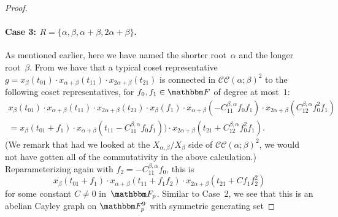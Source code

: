 \documentclass[10pt,a4paper]{article}
\theoremstyle{definition}
\newcommand{\F}{\mathbbm F}
\newcommand{\CC}[2]{\mathcal{C}\mathcal{C}(#1;#2)}
\begin{document}
\begin{proof}
    \paragraph{Case 3: $R = \{\alpha,\beta,\alpha+\beta, 2\alpha+\beta\}$.}  
    As mentioned earlier, here we have named the shorter root~$\alpha$ and the longer root~$\beta$.
    From  we have that a typical coset representative 
    $
        g = x_\beta(t_{01})\cdot x_{\alpha+\beta}(t_{11}) \cdot x_{2\alpha+\beta}(t_{21})
    $
    is connected in $\CC{\alpha}{\beta}^2$ to the following coset representatives, for $f_0, f_1 \in \F$ of degree at most~$1$:
    \begin{multline*}
        x_\beta(t_{01})\cdot x_{\alpha+\beta}(t_{11})\cdot x_{2\alpha+\beta}(t_{21}) \cdot x_{\beta}(f_1) \cdot x_{\alpha+\beta}(-C_{11}^{\beta,\alpha} f_0f_1) \cdot x_{2\alpha+\beta}(C_{12}^{\beta,\alpha} f_0^2f_1) \\
        = x_\beta(t_{01} + f_1)\cdot x_{\alpha+\beta}(t_{11}-C_{11}^{\beta,\alpha} f_0f_1))\cdot x_{2\alpha+\beta}(t_{21}+C_{12}^{\beta,\alpha} f_0^2f_1).
    \end{multline*}
    (We remark that had we looked at the $X_{\alpha,\beta}/X_\beta$ side of $\CC{\alpha}{\beta}^2$, we would not have gotten all of the commutativity in the above calculation.)
    Reparameterizing again with $f_2 = -C_{11}^{\beta,\alpha} f_0$, this is
    \[
        x_\beta(t_{01} + f_1)\cdot x_{\alpha+\beta}(t_{11}+f_1f_2) \cdot x_{2\alpha+\beta}(t_{21}+C f_1f_2^2)
    \]
    for some constant $C \neq 0$ in~$\F_p$.
    Similar to Case~2, we see that this is an abelian Cayley graph on $\F_p^9$ with symmetric generating set

\end{proof}
\end{document}
